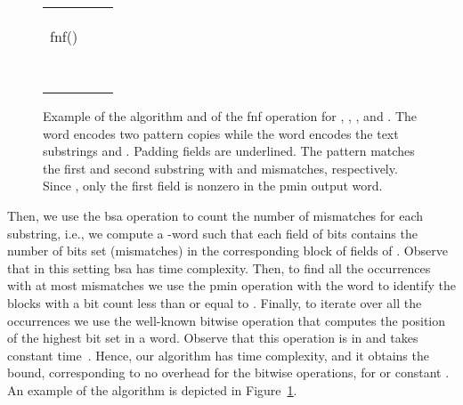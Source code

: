 \documentclass{llncs}
\newcommand{\wrbound}{\xspace}
\newcommand{\fword}[1]{-word}
\begin{document}
\begin{figure}[!t]
\begin{center}
\begin{scriptsize}
\renewcommand{\tabcolsep}{0.09cm}
\begin{tabular}{|rll|}
\hline
 &  &  \\
 &  &  \\
 &  &  \\
\hline
 \textsf{fnf}() & & \\
\hline
 &  &  \\
 &  &  \\
  &  &  \\
 &  &  \\
 &  &  \\
\hline
 &  &  \\
 &  &  \\
 &  &  \\
\hline
\end{tabular}
\end{scriptsize}
\end{center}
\caption{Example of the algorithm and of the \textsf{fnf} operation for , , ,  and . The word  encodes two pattern copies while the word  encodes the text substrings  and . Padding fields are underlined. The pattern matches the first and second substring with  and  mismatches, respectively. Since , only the first field is nonzero in the \textsf{pmin} output word.}
\label{fig:example}
\end{figure}
Then, we use the \textsf{bsa} operation to count the number of mismatches for each substring, i.e., we
compute a \fword{f} such that each field of
 bits contains the number of bits set
(mismatches) in the corresponding block of  fields of .
Observe that in this setting \textsf{bsa} has  time complexity. Then, to find all the occurrences with
at most  mismatches we use the \textsf{pmin} operation with the
word  to identify the blocks with a bit count less than or equal to
. Finally, to iterate over all the occurrences we use the
well-known bitwise operation that computes the position of the highest
bit set in a word. Observe that this operation is in  and takes
constant time~\cite{DBLP:journals/tcs/AnderssonMT99}. Hence, our
algorithm has \wrbound time complexity, and it obtains the
 bound, corresponding to no
overhead for the bitwise operations, for  or constant .
An example of the algorithm is depicted in Figure~\ref{fig:example}.
\end{document}
